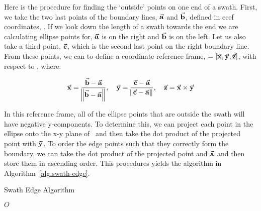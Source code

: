 Here is the procedure for finding the `outside' points on one end of a swath.
First, we take the two last points of the boundary lines, $\vec{\bm{\mathrm{a}}}$ and
$\vec{\bm{\mathrm{b}}}$, defined in \gls{ecef} coordinates, \Fe. If we look down the length
of a swath towards the end we are calculating ellipse points for, $\vec{\bm{\mathrm{a}}}$ is
on the right and $\vec{\bm{\mathrm{b}}}$ is on the left.  Let us also take a third point,
$\vec{\bm{\mathrm{c}}}$, which is the second last point on the right boundary line.  From
these points, we can to define a coordinate reference frame, \Fs $= [\vec{\bm{\mathrm{x}}},
\vec{\bm{\mathrm{y}}}, \vec{\bm{\mathrm{z}}}]$, with respect to \Fe, where:

\begin{equation}
    \vec{\bm{\mathrm{x}}} = \frac{\vec{\bm{\mathrm{b}}}-\vec{\bm{\mathrm{a}}}}{\norm{\vec{\bm{\mathrm{b}}} - \vec{\bm{\mathrm{a}}}}}
    , \quad
    \vec{\bm{\mathrm{y}}} = \frac{\vec{\bm{\mathrm{c}}}-\vec{\bm{\mathrm{a}}}}{\norm{\vec{\bm{\mathrm{c}}} - \vec{\bm{\mathrm{a}}}}}
    , \quad
    \vec{\bm{\mathrm{z}}} = \vec{\bm{\mathrm{x}}} \times \vec{\bm{\mathrm{y}}}
\end{equation}

In this reference frame, all of the ellipse points that are outside the swath
will have negative y-components. To determine this, we can project each point
in the ellipse onto the x-y plane of \Fs~and then take the dot product of the
projected point with $\vec{\bm{\mathrm{y}}}$. To order the edge points such that they
correctly form the boundary, we can take the dot product of the projected point
and $\vec{\bm{\mathrm{x}}}$ and then store them in ascending order. This procedures yields
the algorithm in Algorithm~\ref{alg:swath-edge}.


\begin{algorithm}
    \caption{Swath Edge Algorithm} 
    \label{alg:swath-edge}
    \begin{algorithmic}[1] 
		
		
		


	    \EndIf
	\EndFor
	\State \Return $O$
	\EndFunction
    \end{algorithmic} 
\end{algorithm}

